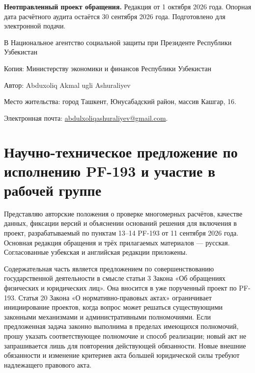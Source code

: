 \documentclass[14pt,a4paper]{extarticle}
\begin{document}
\textbf{Неотправленный проект обращения.} Редакция от 1 октября 2026 года. Опорная дата расчётного аудита остаётся 30 сентября 2026 года. Подготовлено для электронной подачи.

В Национальное агентство социальной защиты при Президенте Республики Узбекистан

Копия: Министерству экономики и финансов Республики Узбекистан

Автор: Abduxoliq Akmal ugli Ashuraliyev

Место жительства: город Ташкент, Юнусабадский район, массив Кашгар, 16.

Электронная почта: \href{mailto:abdulxoliqashuraliyev@gmail.com}{abdulxoliqashuraliyev@gmail.com}.

\section*{Научно-техническое предложение по исполнению PF-193 и участие в рабочей группе}
Представляю авторские положения о проверке многомерных расчётов, качестве данных, фиксации версий и объяснении оснований решения для включения в проект, разрабатываемый по пунктам 13–14 PF-193 от 11 сентября 2026 года. Основная редакция обращения и трёх прилагаемых материалов — русская. Согласованные узбекская и английская редакции приложены.

Содержательная часть является предложением по совершенствованию государственной деятельности в смысле статьи 3 Закона «Об обращениях физических и юридических лиц». Она вносится в уже порученный проект по PF-193. Статья 20 Закона «О нормативно-правовых актах» ограничивает инициирование проектов, когда вопрос может решаться существующими законными механизмами и административными полномочиями. Если предложенная задача законно выполнима в пределах имеющихся полномочий, прошу указать соответствующее полномочие и способ реализации; новый акт не запрашивается лишь для повторения действующей обязанности. Новые внешние обязанности и изменение критериев акта большей юридической силы требуют надлежащего правового акта.
\end{document}
